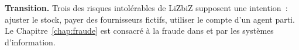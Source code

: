 \begin{boxinfo}
\textbf{Transition.} Trois des risques intolérables de LiZbiZ supposent une
intention~: ajuster le stock, payer des fournisseurs fictifs, utiliser le
compte d'un agent parti. Le Chapitre~\ref{chap:fraude} est consacré à la
fraude dans et par les systèmes d'information.
\end{boxinfo}
